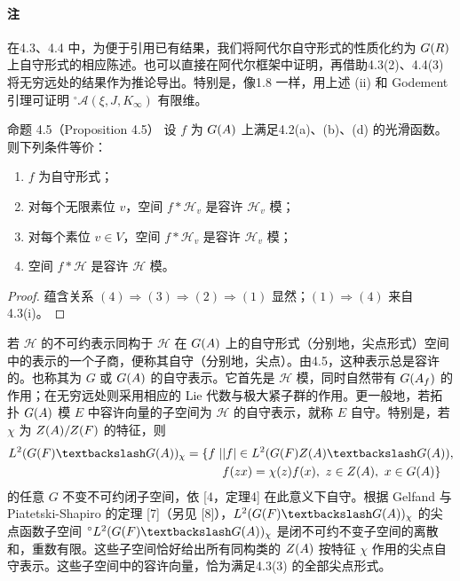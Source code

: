 \paragraph*{注}
在4.3、4.4 中，为便于引用已有结果，我们将阿代尔自守形式的性质化约为 $G(R)$ 上自守形式的相应陈述。也可以直接在阿代尔框架中证明，再借助4.3(2)、4.4(3) 将无穷远处的结果作为推论导出。特别是，像1.8 一样，用上述 (ii) 和 Godement 引理可证明 $^\circ\mathcal A(\xi,J,K_\infty)$ 有限维。
\begin{originaltheorem}{命题 4.5（Proposition 4.5）}
设 $f$ 为 $G(A)$ 上满足4.2(a)、(b)、(d) 的光滑函数。则下列条件等价：
\begin{enumerate}
\item[(1)] $f$ 为自守形式；
\item[(2)] 对每个无限素位 $v$，空间 $f*\mathcal H_v$ 是容许 $\mathcal H_v$ 模；
\item[(3)] 对每个素位 $v\in V$，空间 $f*\mathcal H_v$ 是容许 $\mathcal H_v$ 模；
\item[(4)] 空间 $f*\mathcal H$ 是容许 $\mathcal H$ 模。
\end{enumerate}
\end{originaltheorem}
\begin{proof}
蕴含关系 $(4)\Rightarrow(3)\Rightarrow(2)\Rightarrow(1)$ 显然；$(1)\Rightarrow(4)$ 来自4.3(i)。
\end{proof}
若 $\mathcal H$ 的不可约表示同构于 $\mathcal H$ 在 $G(A)$ 上的自守形式（分别地，尖点形式）空间中的表示的一个子商，便称其自守（分别地，尖点）。由4.5，这种表示总是容许的。也称其为 $G$ 或 $G(A)$ 的自守表示。它首先是 $\mathcal H$ 模，同时自然带有 $G(A_f)$ 的作用；在无穷远处则采用相应的 Lie 代数与极大紧子群的作用。更一般地，若拓扑 $G(A)$ 模 $E$ 中容许向量的子空间为 $\mathcal H$ 的自守表示，就称 $E$ 自守。特别是，若 $\chi$ 为 $Z(A)/Z(F)$ 的特征，则
\[
\begin{aligned}
L^2(G(F)\backslash G(\A))_\chi
=\{f\mid &|f|\in L^2(G(F)Z(\A)\backslash G(\A)),\\
&f(zx)=\chi(z)f(x),\ z\in Z(\A),\ x\in G(\A)\}
\end{aligned}
\]
的任意 $G$ 不变不可约闭子空间，依 [4，定理4] 在此意义下自守。根据 Gelfand 与 Piatetski-Shapiro 的定理 [7]（另见 [8]），$L^2(G(F)\backslash G(\A))_\chi$ 的尖点函数子空间 $^\circ L^2(G(F)\backslash G(\A))_\chi$ 是闭不可约不变子空间的离散和，重数有限。这些子空间恰好给出所有同构类的 $Z(A)$ 按特征 $\chi$ 作用的尖点自守表示。这些子空间中的容许向量，恰为满足4.3(3) 的全部尖点形式。

